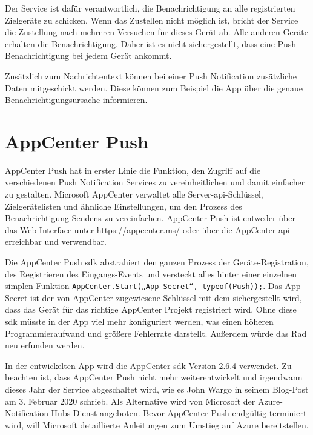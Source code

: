 Der Service ist dafür verantwortlich, die Benachrichtigung an alle registrierten Zielgeräte zu schicken.
Wenn das Zustellen nicht möglich ist, bricht der Service die Zustellung nach mehreren Versuchen für dieses Gerät ab.
Alle anderen Geräte erhalten die Benachrichtigung.
Daher ist es nicht sichergestellt, dass eine Push-Benachrichtigung bei jedem Gerät ankommt.\par

Zusätzlich zum Nachrichtentext können bei einer Push Notification zusätzliche Daten mitgeschickt werden. Diese können zum Beispiel die App über die genaue Benachrichtigungsursache informieren.

\section{AppCenter Push}
AppCenter Push hat in erster Linie die Funktion, den Zugriff auf die verschiedenen Push Notification Services zu vereinheitlichen und damit einfacher zu gestalten.
Microsoft AppCenter verwaltet alle Server-\ac{api}-Schlüssel, Zielgerätelisten und ähnliche Einstellungen, um den Prozess des Benachrichtigung-Sendens zu vereinfachen.
AppCenter Push ist entweder über das Web-Interface unter \url{https://appcenter.ms/} oder über die AppCenter \ac{api} erreichbar und verwendbar.\par

Die AppCenter Push \ac{sdk} abstrahiert den ganzen Prozess der Geräte-Registration, des Registrieren des Eingangs-Events und versteckt alles hinter einer einzelnen simplen Funktion \texttt{AppCenter.Start(„{App Secret}“, typeof(Push));}. Das App Secret ist der von AppCenter zugewiesene Schlüssel mit dem sichergestellt wird, dass das Gerät für das richtige AppCenter Projekt registriert wird.
Ohne diese \ac{sdk} müsste in der App viel mehr konfiguriert werden, was einen höheren Programmieraufwand und größere Fehlerrate darstellt. Außerdem würde das Rad neu erfunden werden.\par

In der entwickelten App wird die AppCenter-\ac{sdk}-Version 2.6.4 verwendet. Zu beachten ist, dass AppCenter Push nicht mehr weiterentwickelt und irgendwann dieses Jahr der Service abgeschaltet wird, wie es John Wargo in seinem Blog-Post am 3. Februar 2020 schrieb. Als Alternative wird von Microsoft der Azure-Notification-Hubs-Dienst angeboten. Bevor AppCenter Push endgültig terminiert wird, will Microsoft detaillierte Anleitungen zum Umstieg auf Azure bereitstellen.